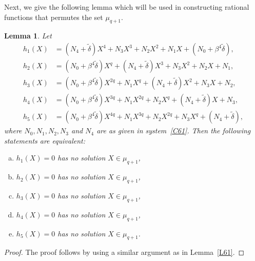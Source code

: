 \documentclass[12pt]{amsart}
\newtheorem{lem}[thm]{Lemma}
\numberwithin{equation}{section}
\theoremstyle{definition}
\begin{document}
 Next, we give the following lemma which will be used in constructing rational functions that permutes the set $\mu_{q+1}$.

\begin{lem} \label{L62}
 Let
 \begin{equation*}
  \begin{split}
   h_1(X)&= (N_4+{\tilde \delta})X^4 +N_3X^3+ N_2X^2+ N_1X+(N_0 + \beta^4{\tilde \delta}),\\
   h_2(X)&= (N_0 +\beta^4  {\tilde \delta})X^q+(N_4+{\tilde \delta})X^3 +N_3X^2+ N_2X+ N_1,\\
   h_3(X)&= (N_0 + \beta^4 {\tilde \delta})X^{2q}+N_1X^q+(N_4+{\tilde \delta})X^2 +N_3X+ N_2, \\
   h_4(X) &= (N_0 +\beta^4 {\tilde \delta})X^{3q}+N_1X^{2q}+N_2X^q+(N_4+{\tilde \delta})X +N_3, \\
   h_5(X) &= (N_0 + \beta^4{\tilde \delta})X^{4q}+N_1X^{3q}+N_2X^{2q}+N_3X^q+(N_4+{\tilde \delta}),
  \end{split}
 \end{equation*}
where $N_0, N_1, N_2, N_3$ and $N_4$ are as given in system~\eqref{C61}. Then the following statements are equivalent:
\begin{enumerate}[(a)]
 \item $h_1(X)=0$ has no solution $X \in \mu_{q+1}$,
 \item $h_2(X)=0$ has no solution $X \in \mu_{q+1}$,
 \item $h_3(X)=0$ has no solution $X \in \mu_{q+1}$,
 \item $h_4(X)=0$ has no solution $X \in \mu_{q+1}$,
 \item $h_5(X)=0$ has no solution $X \in \mu_{q+1}$.
\end{enumerate}
\end{lem}

\begin{proof} 
The proof follows by using a similar argument as in Lemma~\ref{L61}.
\end{proof}
\end{document}
